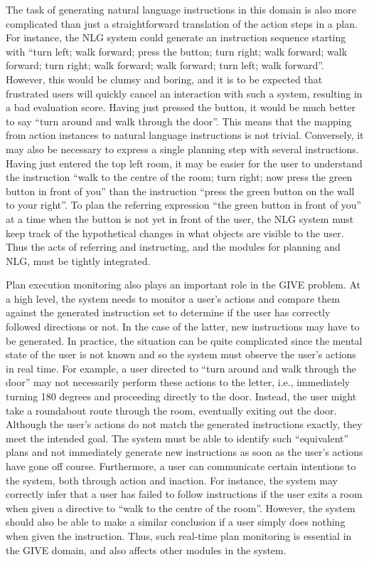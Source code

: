 The task of generating natural language instructions in this domain is also
more complicated than just a straightforward translation of the action
steps in a plan. For instance, the NLG system could generate an instruction
sequence starting with ``turn left; walk forward; press the button; turn
right; walk forward; walk forward; turn right; walk forward; walk forward;
turn left; walk forward''.  However, this would be clumsy and boring, and
it is to be expected that frustrated users will quickly cancel an
interaction with such a system, resulting in a bad evaluation score.
Having just pressed the button, it would be much better to say ``turn
around and walk through the door''.  This means that the mapping from
action instances to natural language instructions is not trivial.
Conversely, it may also be necessary to express a single planning step with
several instructions.  Having just entered the top left room, it may be
easier for the user to understand the instruction ``walk to the centre of
the room; turn right; now press the green button in front of you'' than the
instruction ``press the green button on the wall to your right''.  To plan
the referring expression ``the green button in front of you'' at a time
when the button is not yet in front of the user, the NLG system must keep
track of the hypothetical changes in what objects are visible to the user.
Thus the acts of referring and instructing, and the modules for planning
and NLG, must be tightly integrated.

Plan execution monitoring also plays an important role in the GIVE problem.
At a high level, the system needs to monitor a user's actions and compare
them against the generated instruction set to determine if the user has
correctly followed directions or not. In the case of the latter, new
instructions may have to be generated. In practice, the situation
can be quite complicated since the mental state of the user is not known
and so the system must observe the user's actions in real time. For
example, a user directed to ``turn around and walk through the door'' may
not necessarily perform these actions to the letter, i.e., immediately
turning 180 degrees and proceeding directly to the door. Instead, the user
might take a roundabout route through the room, eventually exiting out the
door. Although the user's actions do not match the generated instructions
exactly, they meet the intended goal. The system must be able to identify
such ``equivalent'' plans and not immediately generate new instructions as
soon as the user's actions have gone off course. Furthermore, a user can
communicate certain intentions to the system, both through action and
inaction. For instance, the system may correctly infer that a user has
failed to follow instructions if the user exits a room when given a
directive to ``walk to the centre of the room''. However, the system should
also be able to make a similar conclusion if a user simply does nothing
when given the instruction. Thus, such real-time plan monitoring is
essential in the GIVE domain, and also affects other modules in the system.


